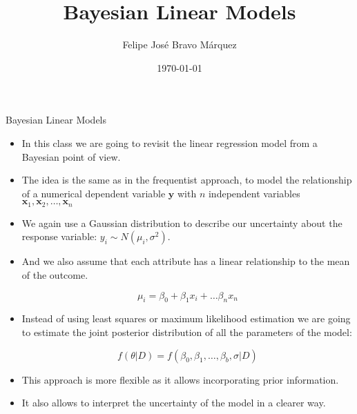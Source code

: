 \documentclass[handout]{beamer}
\title{Bayesian Linear Models}
\author[Felipe Bravo Márquez]{\footnotesize
 \textcolor[rgb]{0.00,0.00,1.00}{Felipe José Bravo Márquez}}
\date{ \today }
\begin{document}
\begin{frame}
\titlepage


\end{frame}




\begin{frame}{Bayesian Linear Models}
\scriptsize{
\begin{itemize}
\item In this class we are going to revisit the linear regression model from a Bayesian point of view.

\item The idea is the same as in the frequentist approach, to model the relationship of a numerical dependent variable $\mathbf{y}$ with $n$ independent variables  $\mathbf{x}_1, \mathbf{x}_2, \dots, \mathbf{x}_n$

\item We again use  a Gaussian distribution to describe our  uncertainty about the response variable: $y_i \sim N(\mu_i, \sigma^2)$.

\item And we also assume that each attribute has a linear relationship to the mean of the outcome.

\begin{displaymath}
\mu_i = \beta_0 + \beta_1 x_i + \dots \beta_n x_n
\end{displaymath}

\item Instead of using least squares or maximum likelihood estimation we are going to estimate the joint posterior distribution of all the parameters of the model:

\begin{displaymath}
f(\theta|D)= f(\beta_0,\beta_1,\dots,\beta_b,\sigma|D)
\end{displaymath}


\item This approach is more flexible as it allows incorporating prior information.

\item It also allows to interpret the uncertainty of the model in a clearer way.




 
\end{itemize}



} 

\end{frame}
\end{document}
